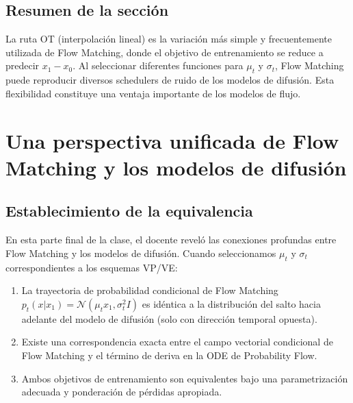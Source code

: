 \documentclass[a4paper]{article}
\begin{document}
\subsection{Resumen de la sección}

La ruta OT (interpolación lineal) es la variación más simple y frecuentemente utilizada de Flow Matching, donde el objetivo de entrenamiento se reduce a predecir $x_1 - x_0$. Al seleccionar diferentes funciones para $\mu_t$ y $\sigma_t$, Flow Matching puede reproducir diversos schedulers de ruido de los modelos de difusión. Esta flexibilidad constituye una ventaja importante de los modelos de flujo.
\section{Una perspectiva unificada de Flow Matching y los modelos de difusión}

\subsection{Establecimiento de la equivalencia}

En esta parte final de la clase, el docente reveló las conexiones profundas entre Flow Matching y los modelos de difusión. Cuando seleccionamos $\mu_t$ y $\sigma_t$ correspondientes a los esquemas VP/VE:

\begin{enumerate}
    \item La trayectoria de probabilidad condicional de Flow Matching $p_t(x | x_1) = \mathcal{N}(\mu_t x_1, \sigma_t^2 I)$ es idéntica a la distribución del salto hacia adelante del modelo de difusión (solo con dirección temporal opuesta).
    \item Existe una correspondencia exacta entre el campo vectorial condicional de Flow Matching y el término de deriva en la ODE de Probability Flow.
    \item Ambos objetivos de entrenamiento son equivalentes bajo una parametrización adecuada y ponderación de pérdidas apropiada.
\end{enumerate}
\end{document}
